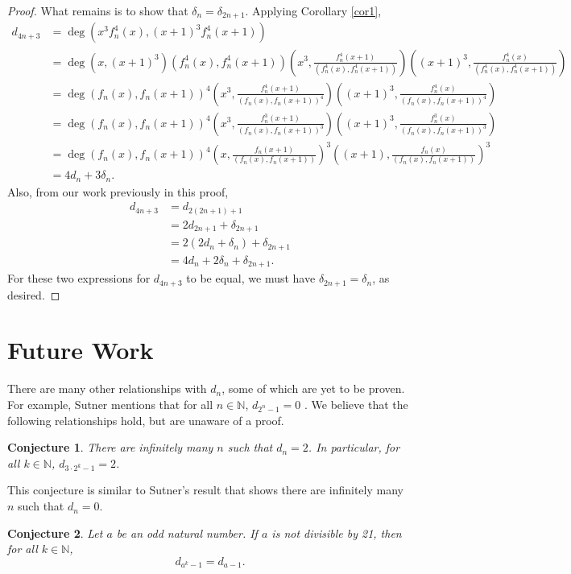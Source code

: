 \documentclass[a4paper]{article}
\newtheorem{conjecture}{Conjecture}
\newcommand{\N}{\mathbb{N}}
\begin{document}
\begin{proof}
		What remains is to show that $\delta_{n} = \delta_{2n+1}$.
		Applying Corollary \ref{cor1},
		\begin{align*}
			d_{4n+3} &= \deg\left(x^3f^4_n(x), (x+1)^3f^4_n(x+1)\right) \\
				&= \deg\left(x,(x+1)^3\right)\left(f^4_n(x),f^4_n(x+1)\right)\left(x^3,\frac{f^4_n(x+1)}{(f^4_n(x),f^4_n(x+1))}\right)\left((x+1)^3,\frac{f^4_n(x)}{(f^4_n(x),f^4_n(x+1))}\right) \\
				&= \deg\left(f_n(x),f_n(x+1)\right)^4\left(x^3,\frac{f^4_n(x+1)}{(f_n(x),f_n(x+1))^4}\right)\left((x+1)^3,\frac{f^4_n(x)}{(f_n(x),f_n(x+1))^4}\right) \\
				&= \deg\left(f_n(x),f_n(x+1)\right)^4\left(x^3,\frac{f^3_n(x+1)}{(f_n(x),f_n(x+1))^3}\right)\left((x+1)^3,\frac{f^3_n(x)}{(f_n(x),f_n(x+1))^3}\right) \\
				&= \deg\left(f_n(x),f_n(x+1)\right)^4\left(x,\frac{f_n(x+1)}{(f_n(x),f_n(x+1))}\right)^3\left((x+1),\frac{f_n(x)}{(f_n(x),f_n(x+1))}\right)^3 \\
				&= 4d_n + 3\delta_n.
		\end{align*}
		Also, from our work previously in this proof,
		\begin{align*}
			d_{4n+3} &= d_{2(2n+1) + 1} \\
				&= 2 d_{2n+1} + \delta_{2n+1} \\
				&= 2 \left(2d_{n} + \delta_{n}\right) + \delta_{2n+1} \\
				&= 4d_{n} + 2\delta_{n} + \delta_{2n+1}.
		\end{align*}
		For these two expressions for $d_{4n+3}$ to be equal, we must have $\delta_{2n+1} = \delta_n$, as desired.
	\end{proof}

	\section{Future Work}
	There are many other relationships with $d_n$, some of which are yet to be proven.
	For example, Sutner mentions that for all $n \in \N$, $d_{2^n - 1} = 0$ \cite{Sutner1989}.
	We believe that the following relationships hold, but are unaware of a proof.
	
	\begin{conjecture}
		There are infinitely many $n$ such that $d_n = 2$.
		In particular, for all $k \in \N$, $d_{3\cdot 2^{k} - 1} = 2$.
	\end{conjecture}
	This conjecture is similar to Sutner's result that shows there are infinitely many $n$ such that $d_n = 0$.
	
	\begin{conjecture}
		Let $a$ be an odd natural number.
		If $a$ is not divisible by 21, then for all $k \in \N$,
		\begin{equation*}
			d_{a^k - 1} = d_{a-1}.
		\end{equation*}
	\end{conjecture}
	
	\newpage
	
	
\end{document}
